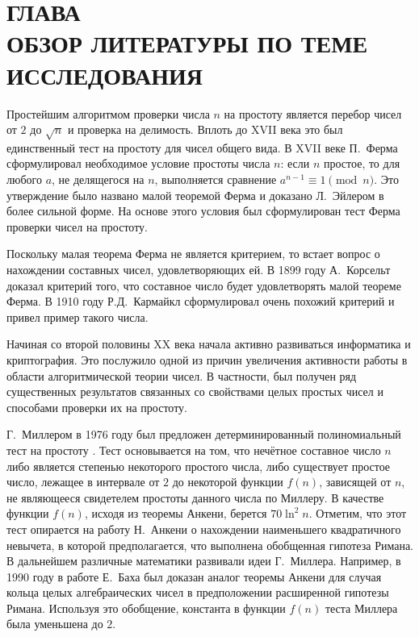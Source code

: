\documentclass[_00_dissertation.tex]{subfiles}
\begin{document}
\onlyinsubfile{
    \renewcommand{\contentsname}{ОГЛАВЛЕНИЕ}
    \setcounter{tocdepth}{3}
    \tableofcontents
}

\chapter*{\MakeUppercase{Глава \\ Обзор литературы по теме исследования}}\label{chapter:Literature_review}


Простейшим алгоритмом проверки числа $n$ на простоту является перебор чисел от $2$ до $\sqrt{n}$ и проверка на делимость.
Вплоть до XVII века это был единственный тест на простоту для чисел общего вида.
В XVII веке П.~Ферма сформулировал необходимое условие простоты числа $n$: если $n$ простое, то для любого $a$, не делящегося на $n$, выполняется сравнение $a^{n-1} \equiv 1{\pmod{n}}$.
Это утверждение было названо малой теоремой Ферма и доказано Л.~Эйлером в более сильной форме.
На основе этого условия был сформулирован тест Ферма проверки чисел на простоту.

Поскольку малая теорема Ферма не является критерием, то встает вопрос о нахождении составных чисел, удовлетворяющих ей.
В 1899 году А.~Корсельт доказал критерий того, что составное число будет удовлетворять малой теореме Ферма.
В 1910 году Р.Д.~Кармайкл сформулировал очень похожий критерий и привел пример такого числа.

Начиная со второй половины XX века начала активно развиваться информатика и криптография.
Это послужило одной из причин увеличения активности работы в области алгоритмической теории чисел.
В частности, был получен ряд существенных результатов связанных со свойствами целых простых чисел и способами проверки их на простоту.

Г.~Миллером в 1976 году был предложен детерминированный полиномиальный тест на простоту \cite{source:Miller}.
Тест основывается на том, что нечётное составное число $n$ либо является степенью некоторого простого числа, либо существует простое число, лежащее в интервале от $2$ до некоторой функции $f(n)$, зависящей от $n$, не являющееся свидетелем простоты данного числа по Миллеру.
В качестве функции $f(n)$, исходя из теоремы Анкени, берется $70 \ln^2 n$.
Отметим, что этот тест опирается на работу Н.~Анкени о нахождении наименьшего квадратичного невычета, в которой предполагается, что выполнена обобщенная гипотеза Римана.
В дальнейшем различные математики развивали идеи Г.~Миллера.
Например, в 1990 году в работе Е.~Баха \cite{source:Bach} был доказан аналог теоремы Анкени для случая кольца целых алгебраических чисел в предположении расширенной гипотезы Римана.
Используя это обобщение, константа в функции $f(n)$ теста Миллера была уменьшена до $2$.
\end{document}
